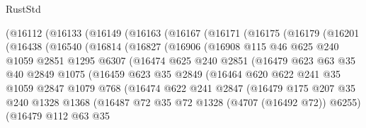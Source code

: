 \begin{lexlean}{RustStd}
\begin{coremodule}
    (@16112
      (@16133
        (@16149
          (@16163
            (@16167
              (@16171
                (@16175
                  (@16179
                    (@16201
                      (@16438
                        (@16540
                          (@16814
                            (@16827
                              (@16906
                                (@16908
                                  @115
                                  @46
                                  @625
                                  @240
                                  @1059
                                  @2851
                                  @1295
                                  @6307
                                  (@16474
                                    @625
                                    @240
                                    @2851
                                    (@16479
                                      @623
                                      @63
                                      @35
                                      @40
                                      @2849
                                      @1075
                                      (@16459
                                        @623
                                        @35
                                        @2849
                                        (@16464
                                          @620
                                          @622
                                          @241
                                          @35
                                          @1059
                                          @2847
                                          @1079
                                          @768
                                          (@16474
                                            @622
                                            @241
                                            @2847
                                            (@16479
                                              @175
                                              @207
                                              @35
                                              @240
                                              @1328
                                              @1368
                                              (@16487 @72 @35 @72 @1328 (@4707 (@16492 @72)) @6255)
                                              (@16479
                                                @112
                                                @63
                                                @35

\end{coremodule}
\end{lexlean}
